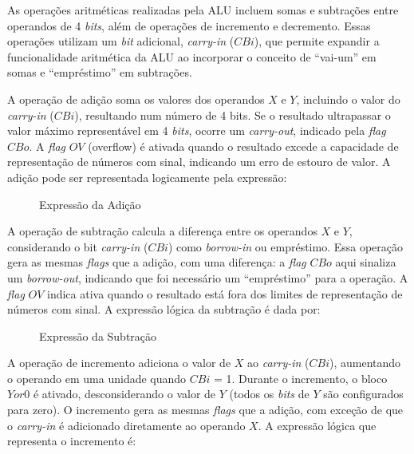 

As operações aritméticas realizadas pela ALU incluem somas e subtrações entre operandos de 4 \textit{bits}, além de operações de incremento e decremento. Essas operações utilizam um \textit{bit} adicional, \textit{carry-in} ($CBi$), que permite expandir a funcionalidade aritmética da ALU ao incorporar o conceito de “vai-um” em somas e “empréstimo” em subtrações.


A operação de adição soma os valores dos operandos $X$ e $Y$, incluindo o valor do \textit{carry-in} ($CBi$), resultando num número de 4 bits. Se o resultado ultrapassar o valor máximo representável em 4 \textit{bits}, ocorre um \textit{carry-out}, indicado pela \textit{flag} $CBo$. A \textit{flag} $OV$ (overflow) é ativada quando o resultado excede a capacidade de representação de números com sinal, indicando um erro de estouro de valor. A adição pode ser representada logicamente pela expressão:

\begin{figure}[H]
    \centering
    \caption{Expressão da Adição}
\end{figure}


A operação de subtração calcula a diferença entre os operandos $X$ e $Y$, considerando o bit \textit{carry-in} ($CBi$) como \textit{borrow-in} ou empréstimo. Essa operação gera as mesmas \textit{flags} que a adição, com uma diferença: a \textit{flag} $CBo$ aqui sinaliza um \textit{borrow-out}, indicando que foi necessário um “empréstimo” para a operação. A \textit{flag} $OV$ indica ativa quando o resultado está fora dos limites de representação de números com sinal. A expressão lógica da subtração é dada por:

\begin{figure}[H]
    \centering
    \caption{Expressão da Subtração}
\end{figure}

\newpage


A operação de incremento adiciona o valor de $X$ ao \textit{carry-in} ($CBi$), aumentando o operando em uma unidade quando $CBi$ = 1. Durante o incremento, o bloco $Yor0$  é ativado, desconsiderando o valor de $Y$ (todos os \textit{bits} de $Y$ são configurados para zero). O incremento gera as mesmas \textit{flags} que a adição, com exceção de que o \textit{carry-in} é adicionado diretamente ao operando $X$. A expressão lógica que representa o incremento é:

